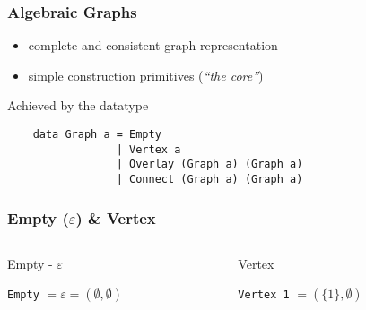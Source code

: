 \documentclass{beamer}
\newcommand{\hs}{\texttt}
\renewcommand{\epsilon}{\varepsilon}
\newcommand{\eps}{\epsilon}
\begin{document}
\begin{frame}[fragile]
  \frametitle{Algebraic Graphs}
  \onslide<+->
  \begin{itemize}
  \item complete and \alert{consistent} graph representation
  \item simple construction primitives (\emph{``the core''})
  \end{itemize}
  \onslide<+->
  \begin{alertblock}{Achieved by the datatype}
    \begin{verbatim}
    data Graph a = Empty
                 | Vertex a
                 | Overlay (Graph a) (Graph a)
                 | Connect (Graph a) (Graph a)
    \end{verbatim}
  \end{alertblock}
\end{frame}

\begin{frame}
  \frametitle{Empty ($\eps$) \& Vertex}
  \begin{columns}[t]
    \onslide<+->
    \begin{column}{.45\textwidth}
      \begin{exampleblock}{Empty - $\eps$}
        \vspace{5pt}
        \centering 
        
        \hs{Empty} ${} = \eps = (\emptyset, \emptyset)$
      \end{exampleblock}
    \end{column}
    \onslide<+->
    \begin{column}{.45\textwidth}
      \begin{exampleblock}{Vertex}
        \vspace{5pt}
        \centering

        \hs{Vertex 1} ${} = (\{1\}, \emptyset)$
      \end{exampleblock}
    \end{column}
  \end{columns}
\end{frame}
\end{document}
